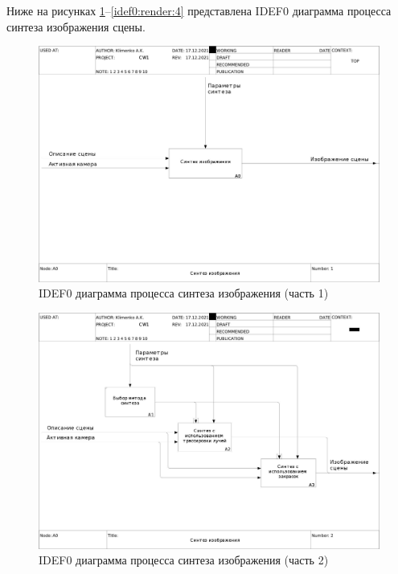 Ниже на рисунках \ref{idef0:render:1}--\ref{idef0:render:4} представлена IDEF0 диаграмма процесса синтеза изображения сцены.

\begin{figure}[ht]
    \centering
    \includegraphics[width=\linewidth,height=0.85\textheight,keepaspectratio]{idef0/01_A0.jpg}
    \caption{IDEF0 диаграмма процесса синтеза изображения (часть 1)}
    \label{idef0:render:1}
\end{figure}

\begin{figure}
    \centering
    \includegraphics[width=\linewidth,height=0.85\textheight,keepaspectratio]{idef0/02_A0.jpg}
    \caption{IDEF0 диаграмма процесса синтеза изображения (часть 2)}
    \label{idef0:render:2}
\end{figure}

